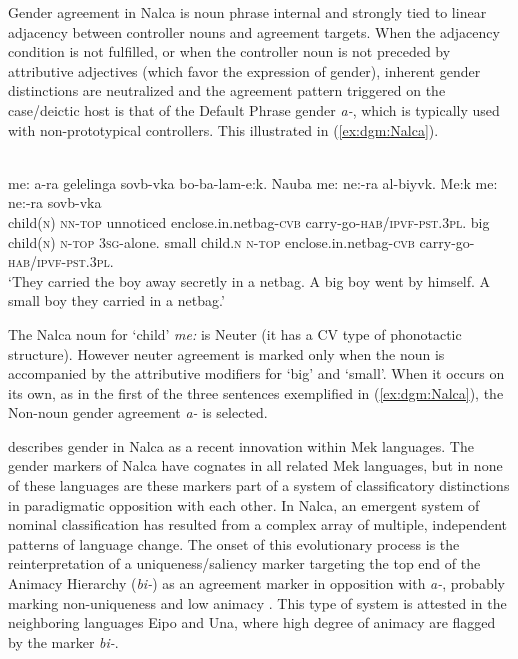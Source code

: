 \documentclass[output=collectionpaper]{langsci/langscibook}
\begin{document}
Gender agreement in Nalca is noun phrase internal and strongly tied to linear adjacency between controller nouns and agreement targets. When the adjacency condition is not fulfilled, or when the controller noun is not preceded by attributive adjectives (which favor the expression of gender), inherent gender distinctions are neutralized and the agreement pattern triggered on the case/deictic host is that of the Default Phrase gender \textit{a-}, which is typically used with non-prototypical controllers. This illustrated in (\ref{ex:dgm:Nalca}).

\ea\label{ex:dgm:Nalca}
\\
\gll me: a-ra gelelinga sovb-vka bo-ba-lam-e:k. Nauba me: ne:-ra al-biyvk. Me:k me: ne:-ra sovb-vka\\
child(\textsc{n}) \textsc{nn-top} unnoticed enclose.in.netbag-\textsc{cvb} carry-go-\textsc{hab/ipvf-pst.3pl}. big child(\textsc{n}) \textsc{n-top} \textsc{3sg-}alone. small child.\textsc{n} \textsc{n-top} enclose.in.netbag-\textsc{cvb} carry-go-\textsc{hab/ipvf-pst.3pl}.\\
\glt `They carried the boy away secretly in a netbag. A big boy went by himself. A small boy they carried in a netbag.'\\
\z

The Nalca noun for `child' \textit{me:} is Neuter (it has a CV type of phonotactic structure). However neuter agreement is marked only when the noun is accompanied by the attributive modifiers for `big' and `small'. When it occurs on its own, as in the first of the three sentences exemplified in (\ref{ex:dgm:Nalca}),  the Non-noun gender agreement \textit{a-} is selected.


\citet{Waelchli2018} describes gender in Nalca as a recent innovation within Mek languages. The gender markers of Nalca have cognates in all related Mek languages, but in none of these languages are these markers part of a system of classificatory distinctions in paradigmatic opposition with each other. In Nalca, an emergent system of nominal classification has resulted from a complex array of multiple, independent patterns of language change. The onset of this evolutionary process is the reinterpretation of a uniqueness/saliency marker targeting the top end of the Animacy Hierarchy (\textit{bi-}) as an agreement marker in opposition with \textit{a-}, probably marking non-uniqueness and low animacy \citep{Waelchli2018}. This type of system is attested in the neighboring languages Eipo and Una, where high degree of animacy are flagged by the marker \textit{bi-}.
\end{document}
